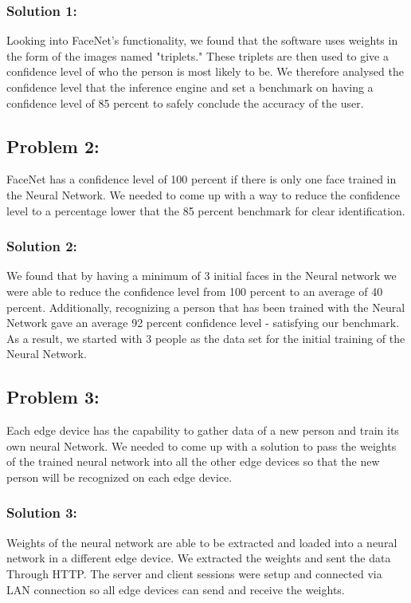 \documentclass[onecolumn, draftclsnofoot,10pt, compsoc]{IEEEtran}
\begin{document}
        \subsubsection{Solution 1:} Looking into FaceNet's functionality, we found that the software uses weights in the form of the images named "triplets." These triplets are then used to give a confidence level of who the person is most likely to be. We therefore analysed the confidence level that the inference engine and set a benchmark on having a confidence level of 85 percent to safely conclude the accuracy of the user. 
    \subsection{Problem 2:} FaceNet has a confidence level of 100 percent if there is only one face trained in the Neural Network. We needed to come up with a way to reduce  the confidence level to a percentage lower that the 85 percent benchmark for clear identification. 
        \subsubsection{Solution 2:} We found that by having a minimum of 3 initial faces in the Neural network we were able to reduce the confidence level from 100 percent to an average of 40 percent. Additionally, recognizing a person that has been trained with the Neural Network gave an average 92 percent confidence level - satisfying our benchmark. As a result, we started with 3 people as the data set for the initial training of the Neural Network. 
    \subsection{Problem 3:} Each edge device has the capability to gather data of a new person and train its own neural Network. We needed to come up with a solution to pass the weights of the trained neural network into all the other edge devices so that the new person will be recognized on each edge device. 
        \subsubsection{Solution 3:} Weights of the neural network are able to be extracted and loaded into a neural network in a different edge device. We extracted the weights and sent the data Through HTTP. The server and client sessions were setup and connected via LAN connection so all edge devices can send and receive the weights.
        
\end{document}
